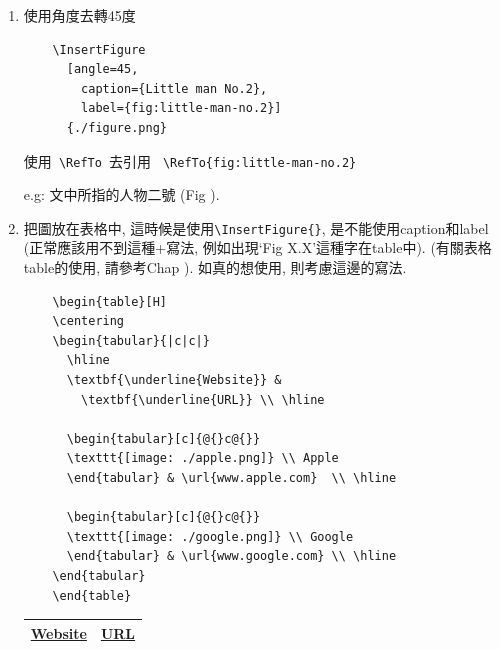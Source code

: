 \begin{enumerate}
  \newpage
  \item
  {
    使用角度去轉45度
    \begin{verbatim}
    \InsertFigure
      [angle=45,
        caption={Little man No.2},
        label={fig:little-man-no.2}]
      {./figure.png}
    \end{verbatim}

    使用\verb| \RefTo |去引用 \verb| \RefTo{fig:little-man-no.2} |

    e.g: 文中所指的人物二號 (Fig ).
  } %

  \newpage
  \item
  {
    把圖放在表格中, 這時候是使用\verb|\InsertFigure{}|, 是不能使用caption和label (正常應該用不到這種+寫法, 例如出現`Fig X.X'這種字在table中). (有關表格table的使用, 請參考Chap ). 如真的想使用, 則考慮這邊的寫法.

    \begin{verbatim}
    \begin{table}[H]
    \centering
    \begin{tabular}{|c|c|}
      \hline
      \textbf{\underline{Website}} &
        \textbf{\underline{URL}} \\ \hline

      \begin{tabular}[c]{@{}c@{}}
      \texttt{[image: ./apple.png]} \\ Apple
      \end{tabular} & \url{www.apple.com}  \\ \hline

      \begin{tabular}[c]{@{}c@{}}
      \texttt{[image: ./google.png]} \\ Google
      \end{tabular} & \url{www.google.com} \\ \hline
    \end{tabular}
    \end{table}
    \end{verbatim}

    \begin{table}[H]
    \centering
    \label{table:how-to:write:figure:insert-figure-into-table}
    \begin{tabular}{|c|c|}
      \hline
      \textbf{\underline{Website}} &
        \textbf{\underline{URL}} \\ \hline


\end{tabular}
\end{table}}
\end{enumerate}
